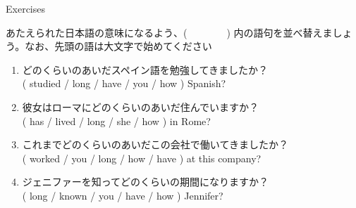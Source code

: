 \documentclass[aspectratio=169,xcolor={dvipsnames,table}]{beamer}
\newcommand{\myaudio}[1]{\href{#1}{\faVolumeUp}}
\begin{document}
\begin{frame}[plain]{Exercises}
 

あたえられた日本語の意味になるよう、(~~~~~~~~) 内の語句を並べ替えましょう。なお、先頭の語は大文字で始めてください\mbox{}\hfill\myaudio{./audio/012_have_pp_keizoku_11.mp3}


\vspace{-5pt}

\begin{enumerate}
 \item どのくらいのあいだスペイン語を勉強してきましたか？\\
( studied / long / have / you / how ) Spanish?\\
 \item 彼女はローマにどのくらいのあいだ住んでいますか？\\
( has / lived / long / she / how ) in Rome?\\
 \item これまでどのくらいのあいだこの会社で働いてきましたか？\\
( worked /  you / long / how / have ) at this company?\\
 \item ジェニファーを知ってどのくらいの期間になりますか？\\
( long / known / you / have / how ) Jennifer?\\
\end{enumerate}
\end{frame}
\end{document}
